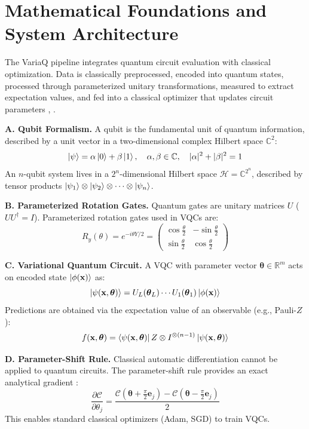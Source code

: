\documentclass[conference]{IEEEtran}
\begin{document}
\section{Mathematical Foundations and System Architecture}

The VariaQ pipeline integrates quantum circuit evaluation with classical optimization. Data is classically preprocessed, encoded into quantum states, processed through parameterized unitary transformations, measured to extract expectation values, and fed into a classical optimizer that updates circuit parameters \cite{pennylane2022}, \cite{scikit2011}.

\textbf{A. Qubit Formalism.} A qubit is the fundamental unit of quantum information, described by a unit vector in a two-dimensional complex Hilbert space $\mathbb{C}^2$:
\[
\ket{\psi} = \alpha\ket{0} + \beta\ket{1}, \quad \alpha, \beta \in \mathbb{C}, \quad |\alpha|^2 + |\beta|^2 = 1
\]
An $n$-qubit system lives in a $2^n$-dimensional Hilbert space $\mathcal{H} = \mathbb{C}^{2^n}$, described by tensor products $\ket{\psi_1} \otimes \ket{\psi_2} \otimes \cdots \otimes \ket{\psi_n}$.

\textbf{B. Parameterized Rotation Gates.} Quantum gates are unitary matrices $U$ ($UU^\dagger = I$). Parameterized rotation gates used in VQCs are:
\[
R_y(\theta) = e^{-i\theta Y/2} = \begin{pmatrix} \cos\frac{\theta}{2} & -\sin\frac{\theta}{2} \\ \sin\frac{\theta}{2} & \cos\frac{\theta}{2} \end{pmatrix}
\]

\textbf{C. Variational Quantum Circuit.} A VQC with parameter vector $\boldsymbol{\theta} \in \mathbb{R}^m$ acts on encoded state $\ket{\phi(\mathbf{x})}$ as:
\[
\ket{\psi(\mathbf{x}, \boldsymbol{\theta})} = U_L(\boldsymbol{\theta}_L) \cdots U_1(\boldsymbol{\theta}_1)\ket{\phi(\mathbf{x})}
\]
Predictions are obtained via the expectation value of an observable (e.g., Pauli-$Z$):
\[
f(\mathbf{x}, \boldsymbol{\theta}) = \bra{\psi(\mathbf{x}, \boldsymbol{\theta})} Z \otimes I^{\otimes(n-1)} \ket{\psi(\mathbf{x}, \boldsymbol{\theta})}
\]

\textbf{D. Parameter-Shift Rule.} Classical automatic differentiation cannot be applied to quantum circuits. The parameter-shift rule provides an exact analytical gradient \cite{schuld2019}:
\[
\frac{\partial \mathcal{C}}{\partial \theta_j} = \frac{\mathcal{C}\!\left(\boldsymbol{\theta} + \frac{\pi}{2}\mathbf{e}_j\right) - \mathcal{C}\!\left(\boldsymbol{\theta} - \frac{\pi}{2}\mathbf{e}_j\right)}{2}
\]
This enables standard classical optimizers (Adam, SGD) to train VQCs.
\end{document}
